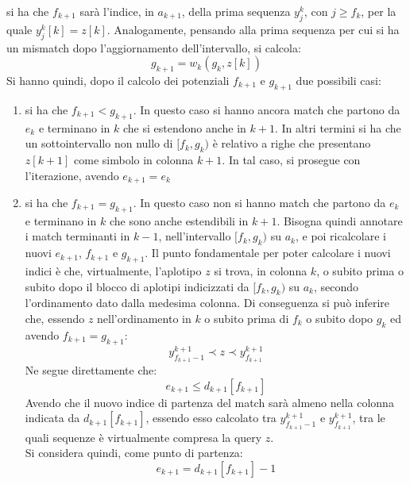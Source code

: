 si ha che $f_{k+1}$ sarà l'indice, in $a_{k+1}$, della prima sequenza $y_j^k$,
con $j\geq f_k$, per la quale $y_j^k[k]=z[k]$. Analogamente, pensando alla prima
sequenza per cui si ha un mismatch dopo l'aggiornamento dell'intervallo, si
calcola: 
\begin{equation}
  \label{eq:pbwtq6}
  g_{k+1}=w_k(g_k,z[k])
\end{equation}
Si hanno quindi, dopo il calcolo dei potenziali $f_{k+1}$ e $g_{k+1}$ due
possibili casi: 
\begin{enumerate}
  \item si ha che $f_{k+1}<g_{k+1}$. In questo caso si hanno ancora match che
  partono da $e_k$ e terminano in $k$ che si estendono anche in $k+1$. In altri
  termini si 
  ha che un sottointervallo non nullo di $[f_k, g_k)$ è relativo a righe che
  presentano $z[k+1]$ come simbolo in colonna $k+1$. In tal caso, si
  prosegue con l'iterazione, avendo $e_{k+1}=e_k$
  \item si ha che $f_{k+1}=g_{k+1}$. In questo caso non si hanno match che
  partono da $e_k$ e terminano in $k$ che sono anche estendibili in
  $k+1$. Bisogna quindi 
  annotare i match terminanti in $k-1$, nell'intervallo $[f_k,g_k)$ su $a_k$,
  e poi ricalcolare i nuovi $e_{k+1}$, $f_{k+1}$ e $g_{k+1}$. Il punto
  fondamentale per poter calcolare i nuovi indici è 
  che, virtualmente, l'aplotipo $z$ si trova, in colonna $k$, o subito prima o
  subito dopo il blocco di aplotipi indicizzati da $[f_k,g_k)$ su $a_k$, secondo
  l'ordinamento dato dalla medesima colonna. Di conseguenza si può inferire che,
  essendo $z$
  nell'ordinamento in $k$ o subito prima di $f_{k}$ o subito dopo $g_k$ ed
  avendo $f_{k+1}=g_{k+1}$: 
  \begin{equation}
    \label{eq:pbwtsmem1}
    y_{f_{k+1}-1}^{k+1}\prec z\prec y_{f_{k+1}}^{k+1}
  \end{equation}
  Ne segue direttamente che:
  \begin{equation}
    \label{eq:pbwtsmem2}
    e_{k+1}\leq d_{k+1}[f_{k+1}]
  \end{equation}
  Avendo che il nuovo indice di partenza del match sarà almeno nella colonna
  indicata da $d_{k+1}[f_{k+1}]$, essendo esso calcolato tra $
  y_{f_{k+1}-1}^{k+1}$ e $ y_{f_{k+1}}^{k+1}$, tra le quali sequenze è
  virtualmente compresa la query $z$. \\
  Si considera quindi, come punto di partenza:
  \begin{equation}
    \label{eq:pbwtsmem3}
    e_{k+1}=d_{k+1}[f_{k+1}]-1
  \end{equation}

\end{enumerate}
